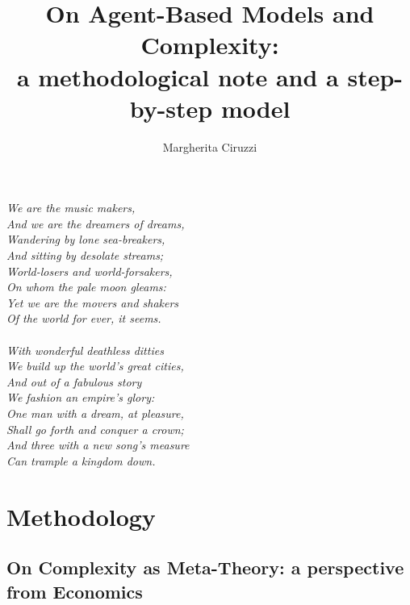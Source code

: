 \documentclass[]{book}
\title{On Agent-Based Models and Complexity:\\ a methodological note and a step-by-step model}
\author{Margherita Ciruzzi}
\date{}
\begin{document}
\pagestyle{empty}

\maketitle
\cleardoublepage

\vspace{5em}
\begin{flushright}
    \itshape
    We are the music makers,\\
    And we are the dreamers of dreams,\\
    Wandering by lone sea-breakers,\\
    And sitting by desolate streams;\\
    World-losers and world-forsakers,\\
    On whom the pale moon gleams:\\
    Yet we are the movers and shakers\\
    Of the world for ever, it seems.\\

    ~\\

    With wonderful deathless ditties\\
    We build up the world's great cities,\\
    And out of a fabulous story\\
    We fashion an empire's glory:\\
    One man with a dream, at pleasure,\\
    Shall go forth and conquer a crown;\\
    And three with a new song's measure\\
    Can trample a kingdom down.
\end{flushright}
\cleardoublepage

\tableofcontents

\pagestyle{plain}


\part{Methodology}

\chapter[On Complexity as Meta-Theory]{On Complexity as Meta-Theory: a perspective from Economics}
\label{ch:complexity}



\end{document}
